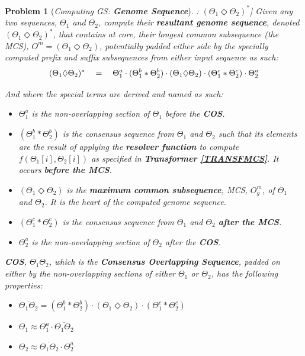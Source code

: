 \documentclass[a4paper, 18pt]{book} %
\newtheorem{prob}{Problem}
\begin{document}
\begin{prob}[\textit{Computing GS: \textbf{Genome Sequence}}]: $(\Theta_1 \Diamond \Theta_2)^*$] 
\label{PROBGS}
Given any two sequences, $\Theta_1$ and $\Theta_2$, compute their \textbf{resultant genome sequence}, denoted $(\Theta_1 \Diamond \Theta_2)^*$, that contains at core, their longest common subsequence (the MCS), $O^m = (\Theta_1 \Diamond \Theta_2)$, potentially padded either side by the specially computed prefix and suffix subsequences from either input sequence as such:\\

\begin{equation}
\label{EQGS}
(\Theta_1 \Diamond \Theta_2)^* \quad = \quad \Theta_1^a\cdot(\Theta_1^b \ast \Theta_2^b)\cdot(\Theta_1 \Diamond \Theta_2)\cdot(\Theta_1^c \ast \Theta_2^c)\cdot\Theta_2^a\\\\
\end{equation}

And where the special terms are derived and named as such:

\begin{itemize}
\item $\Theta_1^a$ is the non-overlapping section of $\Theta_1$ before the \textbf{COS}.
\item $(\Theta_1^b \ast \Theta_2^b)$ is the consensus sequence from $\Theta_1$ and $\Theta_2$ such that its elements are the result of applying the \textbf{resolver function} to compute $f(\Theta_1[i],\Theta_2[i])$ as specified in \textbf{Transformer \ref{TRANSFMCS}}. It occurs \textbf{before the MCS}.
\item $(\Theta_1 \Diamond \Theta_2)$ is the \textbf{maximum common subsequence}, MCS, $O^m_g$, of $\Theta_1$ and $\Theta_2$. It is the heart of the computed genome sequence.
\item $(\Theta_1^c \ast \Theta_2^c)$ is the consensus sequence from $\Theta_1$ and $\Theta_2$ \textbf{after the MCS}.
\item  $\Theta_2^a$ is the non-overlapping section of $\Theta_2$ after the \textbf{COS}.
\end{itemize}

\textbf{COS}, $\overline{\Theta_1\Theta_2}$, which is the \textbf{Consensus Overlapping Sequence}, padded on either by the non-overlapping sections of either $\Theta_1$ or $\Theta_2$, has the following properties:

\begin{itemize}
\item $\overline{\Theta_1\Theta_2} = (\Theta_1^b \ast \Theta_2^b)\cdot(\Theta_1 \Diamond \Theta_2)\cdot(\Theta_1^c \ast \Theta_2^c)$
\item $\Theta_1 \approx \Theta_1^a \cdot \overline{\Theta_1\Theta_2}$
\item $\Theta_2 \approx \overline{\Theta_1\Theta_2} \cdot \Theta_2^a$
\end{itemize}


\end{prob}
\end{document}
